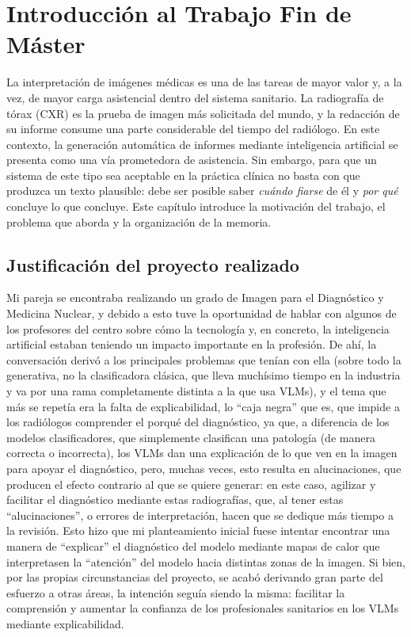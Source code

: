 \chapter{Introducción al Trabajo Fin de Máster}

La interpretación de imágenes médicas es una de las tareas de mayor valor y, a la vez, de mayor
carga asistencial dentro del sistema sanitario. La radiografía de tórax (CXR) es la prueba de
imagen más solicitada del mundo, y la redacción de su informe consume una parte considerable del
tiempo del radiólogo. En este contexto, la generación automática de informes mediante inteligencia
artificial se presenta como una vía prometedora de asistencia. Sin embargo, para que un sistema de
este tipo sea aceptable en la práctica clínica no basta con que produzca un texto plausible: debe
ser posible saber \textit{cuándo fiarse} de él y \textit{por qué} concluye lo que concluye. Este
capítulo introduce la motivación del trabajo, el problema que aborda y la organización de la
memoria.

\section{Justificación del proyecto realizado}

Mi pareja se encontraba realizando un grado de Imagen para el Diagnóstico y Medicina Nuclear, y debido
a esto tuve la oportunidad de hablar con algunos de los profesores del centro sobre cómo la tecnología
y, en concreto, la inteligencia artificial estaban teniendo un impacto importante en la profesión. De
ahí, la conversación derivó a los principales problemas que tenían con ella (sobre todo la generativa,
no la clasificadora clásica, que lleva muchísimo tiempo en la industria y va por una rama completamente
distinta a la que usa VLMs), y el tema que más se repetía era la falta de explicabilidad, lo ``caja
negra'' que es, que impide a los radiólogos comprender el porqué del diagnóstico, ya que, a diferencia
de los modelos clasificadores, que simplemente clasifican una patología (de manera correcta o
incorrecta), los VLMs dan una explicación de lo que ven en la imagen para apoyar el diagnóstico, pero,
muchas veces, esto resulta en alucinaciones, que producen el efecto contrario al que se quiere generar:
en este caso, agilizar y facilitar el diagnóstico mediante estas radiografías, que, al tener estas
``alucinaciones'', o errores de interpretación, hacen que se dedique más tiempo a la revisión. Esto hizo
que mi planteamiento inicial fuese intentar encontrar una manera de ``explicar'' el diagnóstico del
modelo mediante mapas de calor que interpretasen la ``atención'' del modelo hacia distintas zonas de la
imagen. Si bien, por las propias circunstancias del proyecto, se acabó derivando gran parte del esfuerzo
a otras áreas, la intención seguía siendo la misma: facilitar la comprensión y aumentar la confianza de
los profesionales sanitarios en los VLMs mediante explicabilidad.

